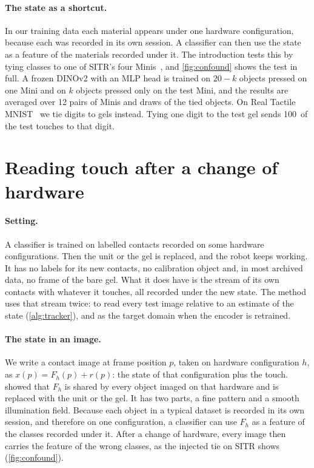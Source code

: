 \paragraph{The state as a shortcut.}
\label{sec:confound}
In our training data each material appears under one hardware configuration, because each was recorded in its own session. A classifier can then use the state as a feature of the materials recorded under it. The introduction tests this by tying classes to one of SITR's four Minis~\cite{sitr2025}, and \cref{fig:confound} shows the test in full. A frozen DINOv2 with an MLP head is trained on $20-k$ objects pressed on one Mini and on $k$ objects pressed only on the test Mini, and the results are averaged over 12 pairs of Minis and draws of the tied objects. On Real Tactile MNIST~\cite{tactilemnist2025} we tie digits to gels instead. Tying one digit to the test gel sends 100\pct\ of the test touches to that digit.

\section{Reading touch after a change of hardware}
\label{sec:method}
\label{sec:tracker}

\paragraph{Setting.}
A classifier is trained on labelled contacts recorded on some hardware configurations. Then the unit or the gel is replaced, and the robot keeps working. It has no labels for its new contacts, no calibration object and, in most archived data, no frame of the bare gel. What it does have is the stream of its own contacts with whatever it touches, all recorded under the new state. The method uses that stream twice: to read every test image relative to an estimate of the state (\cref{alg:tracker}), and as the target domain when the encoder is retrained.

\paragraph{The state in an image.}
We write a contact image at frame position $p$, taken on hardware configuration $h$, as $x(p) = F_h(p) + r(p)$: the state of that configuration plus the touch.  showed that $F_h$ is shared by every object imaged on that hardware and is replaced with the unit or the gel. It has two parts, a fine pattern and a smooth illumination field. Because each object in a typical dataset is recorded in its own session, and therefore on one configuration, a classifier can use $F_h$ as a feature of the classes recorded under it. After a change of hardware, every image then carries the feature of the wrong classes, as the injected tie on SITR shows (\cref{fig:confound}).


